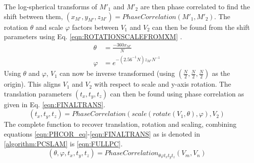 The log-spherical transforms of $M'_1$ and $M'_2$ are then phase correlated to find the shift between them, $(x_{M'},y_{M'},z_{M'}) = PhaseCorrelation(M'_1, M'_2)$. The rotation $\theta$ and scale $\varphi$ factors between $V_1$ and $V_2$ can then be found from the shift parameters using Eq. \ref{eqn:ROTATIONSCALEFROMXM} . 
\begin{equation} \label{eqn:ROTATIONSCALEFROMXM}
\begin{split}
\theta & = \frac{-360x_{M'}}{N}\\
\varphi & = e^{
-\left(
2.56^{-1}N
\right)z_{M'}N^{-1}
}
\end{split}
\end{equation}
Using $\theta$ and $\varphi$, $V_1$ can now be inverse transformed (using $(\frac{N}{2}, \frac{N}{2}, \frac{N}{2})$ as the origin). This aligns $V_1$ and $V_2$ with respect to scale and y-axis rotation. The translation parameters $(t_x, t_y, t_z)$ can then be found using phase correlation as given in Eq. \ref{eqn:FINALTRANS}.
\begin{equation} \label{eqn:FINALTRANS}
(t_x, t_y, t_z) = PhaseCorrelation(scale(rotate(V_1,\theta),\varphi), V_2)
\end{equation}
The complete function to recover translation, rotation and scaling, combining equations \ref{eqn:PHCOR_eq}-\ref{eqn:FINALTRANS} as is denoted in \ref{algorithm:PCSLAM} is \ref{eqn:FULLPC}.
\begin{equation} \label{eqn:FULLPC}
(\theta, \varphi, t_x, t_y, t_z) = PhaseCorrelation_{\theta \varphi t_x t_y t_z}(V_m, V_n)
\end{equation}

